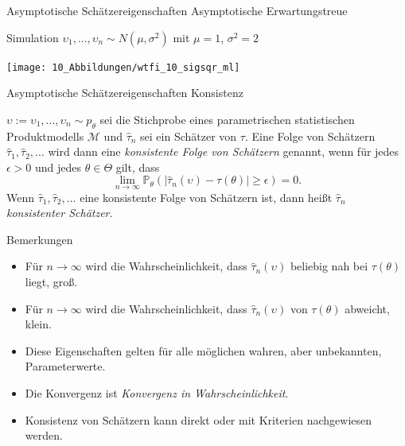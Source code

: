 \documentclass[
  8pt,
  ignorenonframetext,
]{beamer}
\providecommand{\tightlist}{%
  \setlength{\itemsep}{0pt}\setlength{\parskip}{0pt}}
\newcommand{\ups} {\upsilon}
\begin{document}
\begin{frame}{\small Asymptotische Schätzereigenschaften \textbar{}
Asymptotische Erwartungstreue}
\protect\hypertarget{asymptotische-schuxe4tzereigenschaften-asymptotische-erwartungstreue-3}{}
\small

Simulation \(\ups_1,...,\ups_n \sim N(\mu,\sigma^2)\) mit \(\mu = 1\),
\(\sigma^2 = 2\) \vspace{2mm}

\begin{center}\texttt{[image: 10\_Abbildungen/wtfi\_10\_sigsqr\_ml]} \end{center}
\end{frame}

\begin{frame}{\small Asymptotische Schätzereigenschaften \textbar{}
Konsistenz}
\protect\hypertarget{asymptotische-schuxe4tzereigenschaften-konsistenz}{}
\small
\begin{definition}[Konsistenz]
\justifying
$\ups := \ups_1,...,\ups_n \sim p_\theta$ sei die Stichprobe eines parametrischen statistischen
Produktmodells $\mathcal{M}$ und $\hat{\tau}_n$ sei ein Schätzer von $\tau$. Eine
Folge von Schätzern $\hat{\tau}_1, \hat{\tau}_2, ...$ wird dann eine
\textit{konsistente Folge von Schätzern} genannt, wenn für jedes $\epsilon > 0$
und jedes $\theta \in \Theta$ gilt, dass
\begin{equation*}
\lim_{n\to \infty}
\mathbb{P}_\theta\left(|\hat{\tau}_n(\ups) - \tau(\theta)| \ge \epsilon \right) = 0.
\end{equation*}
Wenn $\hat{\tau}_1,\hat{\tau}_2,...$ eine konsistente Folge von Schätzern ist,
dann heißt $\hat{\tau}_n$   \textit{konsistenter Schätzer}.
\end{definition}
\footnotesize

Bemerkungen

\begin{itemize}
\tightlist
\item
  \justifying Für \(n \to \infty\) wird die Wahrscheinlichkeit, dass
  \(\hat{\tau}_n(\ups)\) beliebig nah bei \(\tau(\theta)\) liegt, groß.
\item
  Für \(n \to \infty\) wird die Wahrscheinlichkeit, dass
  \(\hat{\tau}_n(\ups)\) von \(\tau(\theta)\) abweicht, klein.
\item
  Diese Eigenschaften gelten für alle möglichen wahren, aber
  unbekannten, Parameterwerte.
\item
  Die Konvergenz ist \textit{Konvergenz in Wahrscheinlichkeit}.
\item
  Konsistenz von Schätzern kann direkt oder mit Kriterien nachgewiesen
  werden.
\end{itemize}
\end{frame}
\end{document}
